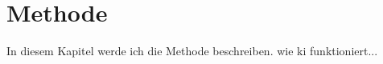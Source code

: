 \chapter{Methode}
\label{chap:methode}

In diesem Kapitel werde ich die Methode beschreiben.
wie ki funktioniert...